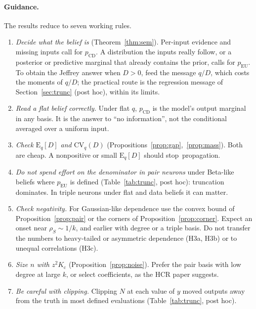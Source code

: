 \documentclass[10pt,a4paper]{article}
\newcommand{\pcd}{p_{\mathrm{CD}}}
\newcommand{\peu}{p_{\mathrm{EU}}}
\newcommand{\rs}{\rho_S}
\newcommand{\Eq}{\mathrm{E}_q}
\newcommand{\CV}{\mathrm{CV}_q}
\theoremstyle{upright}
\begin{document}
\paragraph{Guidance.} The results reduce to seven working rules.
\begin{enumerate}
\item \emph{Decide what the belief is} (Theorem~\ref{thm:sem}). Per-input evidence and missing inputs call for $\pcd$. A distribution the inputs really follow, or a posterior or predictive marginal that already contains the prior, calls for $\peu$. To obtain the Jeffrey answer when $D>0$, feed the message $q/D$, which costs the moments of $q/D$; the practical route is the regression message of Section~\ref{sec:trunc} (post hoc), within its limits.
\item \emph{Read a flat belief correctly.} Under flat $q$, $\pcd$ is the model's output marginal in any basis. It is the answer to ``no information'', not the conditional averaged over a uniform input.
\item \emph{Check $\Eq[D]$ and $\CV(D)$} (Propositions~\ref{prop:gap},~\ref{prop:mass}). Both are cheap. A nonpositive or small $\Eq[D]$ should stop~propagation.
\item \emph{Do not spend effort on the denominator in pair neurons} under Beta-like beliefs where $\peu$ is defined (Table~\ref{tab:trunc}, post hoc): truncation dominates. In triple neurons under flat and data beliefs it can matter.
\item \emph{Check negativity.} For Gaussian-like dependence use the convex bound of Proposition~\ref{prop:pair} or the corners of Proposition~\ref{prop:corner}. Expect an onset near $\rs\sim1/k$, and earlier with degree or a triple basis. Do not transfer the numbers to heavy-tailed or asymmetric dependence (H3a, H3b) or to unequal correlations (H3c).
\item \emph{Size $n$ with $z^2K_{\mathrm c}$} (Proposition~\ref{prop:noise}). Prefer the pair basis with low degree at large $k$, or select coefficients, as the HCR paper suggests.
\item \emph{Be careful with clipping.} Clipping $N$ at each value of $y$ moved outputs away from the truth in most defined evaluations (Table~\ref{tab:trunc}, post hoc).
\end{enumerate}
\end{document}
